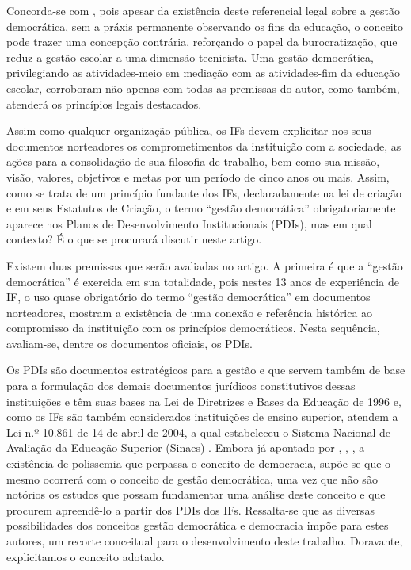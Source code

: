 \documentclass[portuguese]{textolivre}
\begin{document}
Concorda-se com \textcite{paro_gestao_1998}, pois apesar da existência deste referencial legal sobre a gestão democrática, sem a práxis permanente observando os fins da educação, o conceito pode trazer uma concepção contrária, reforçando o papel da burocratização, que reduz a gestão escolar a uma dimensão tecnicista. Uma gestão democrática, privilegiando as atividades-meio em mediação com as atividades-fim da educação escolar, corroboram não apenas com todas as premissas do autor, como também, atenderá os princípios legais destacados.

Assim como qualquer organização pública, os IFs devem explicitar nos seus documentos norteadores os comprometimentos da instituição com a sociedade, as ações para a consolidação de sua filosofia de trabalho, bem como sua missão, visão, valores, objetivos e metas por um período de cinco anos ou mais. Assim, como se trata de um princípio fundante dos IFs, declaradamente na lei de criação e em seus Estatutos de Criação, o termo “gestão democrática” obrigatoriamente aparece nos Planos de Desenvolvimento Institucionais (PDIs), mas em qual contexto? É o que se procurará discutir neste artigo.

Existem duas premissas que serão avaliadas no artigo. A primeira é que a “gestão democrática” é exercida em sua totalidade, pois nestes 13 anos de experiência de IF, o uso quase obrigatório do termo “gestão democrática” em documentos norteadores, mostram a existência de uma conexão e referência histórica ao compromisso da instituição com os princípios democráticos. Nesta sequência, avaliam-se, dentre os documentos oficiais, os PDIs.

Os PDIs são documentos estratégicos para a gestão e que servem também de base para a formulação dos demais documentos jurídicos constitutivos dessas instituições e têm suas bases na Lei de Diretrizes e Bases da Educação de 1996 e, como os IFs são também considerados instituições de ensino superior, atendem a Lei n.º 10.861 de 14 de abril de 2004, a qual estabeleceu o Sistema Nacional de Avaliação da Educação Superior (Sinaes) \cite{brasil__lei_nodate-1}. Embora já apontado por \textcite{boas_filho_democracia:_2013}, \textcite{lourenco_dos_2019}, \textcite{pogrebinschi_entre_2010}, a existência de polissemia que perpassa o conceito de democracia, supõe-se que o mesmo ocorrerá com o conceito de gestão democrática, uma vez que não são notórios os estudos que possam fundamentar uma análise deste conceito e que procurem apreendê-lo a partir dos PDIs dos IFs. Ressalta-se que as diversas possibilidades dos conceitos gestão democrática e democracia impõe para estes autores, um recorte conceitual para o desenvolvimento deste trabalho. Doravante, explicitamos o conceito adotado.
\end{document}

